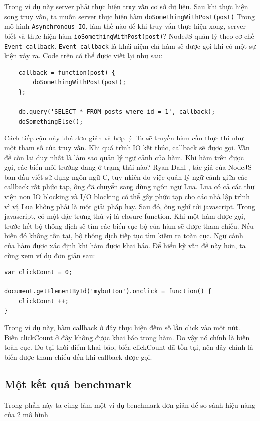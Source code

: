 	Trong ví dụ này server phải thực hiện truy vấn cơ sở dữ liệu. Sau khi thực hiện song truy vấn, ta muốn server thực hiện hàm \texttt{doSomethingWithPost(post)} Trong mô hình \texttt{Asynchronous IO}, làm thế nào để khi truy vấn thực hiện xong, server biết và thực hiện hàm \texttt{ioSomethingWithPost(post)}? NodeJS quản lý theo cơ chế \texttt{Event callback}. \texttt{Event callback} là khái niệm chỉ hàm sẽ được gọi khi có một sự kiện xảy ra.
	Code trên có thể được viết lại như sau:
\begin{verbatim}
	callback = function(post) {
		doSomethingWithPost(post);
	};

	db.query('SELECT * FROM posts where id = 1', callback);
	doSomethingElse();
\end{verbatim}
	Cách tiếp cận này khá đơn giản và hợp lý. Ta sẽ truyền hàm cần thực thi như một tham số của truy vấn. Khi quá trình IO kết thúc, callback sẽ được gọi.
	Vấn đề còn lại duy nhất là làm sao quản lý ngữ cảnh của hàm. Khi hàm trên được gọi, các biến môi trường đang ở trạng thái nào? Ryan Dahl , tác giả của NodeJS ban đầu viết sử dụng ngôn ngữ C, tuy nhiên do việc quản lý ngữ cảnh giữa các callback rất phức tạp, ông đã chuyển sang dùng ngôn ngữ Lua. Lua có cả các thư viện non IO blocking và I/O blocking có thể gây phức tạp cho các nhà lập trình vì vậ Lua không phải là một giải pháp hay. Sau đó, ông nghĩ tới javascript. Trong javascript, có một đặc trưng thú vị là closure function. Khi một hàm được gọi, trước hết bộ thông dịch sẽ tìm các biến cục bộ của hàm sẽ được tham chiếu. Nếu biến đó không tồn tại, bộ thông dịch tiếp tục tìm kiếm ra toàn cục. Ngữ cảnh của hàm được xác định khi hàm được khai báo. Để hiểu kỹ vấn đề này hơn, ta cùng xem ví dụ đơn giản sau:

\begin{verbatim}
var clickCount = 0;
	
document.getElementById('mybutton').onclick = function() {
	clickCount ++;
}
\end{verbatim}
	Trong ví dụ này, hàm callback ở đây thực hiện đếm số lần click vào một nút. Biến clickCount ở đây không được khai báo trong hàm. Do vậy nó chính là biến toàn cục. Do tại thời điểm khai báo, biến clickCount đã tồn tại, nên đây chính là biến được tham chiếu đến khi callback được gọi.
	
\subsection{Một kết quả benchmark}
Trong phần này ta cùng làm một ví dụ benchmark đơn giản để so sánh hiệu năng của 2 mô hình \\
	
